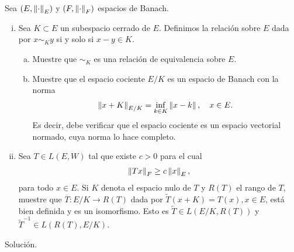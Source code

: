 \begin{homeworkProblem}
  Sea $(E,\left\|\cdot\right\|_{E})$ y $(F,\left\|\cdot\right\|_{F})$ espacios de Banach.
  \begin{enumerate}[(i)]
    \item Sea $K\subset E$ un subespacio cerrado de $E$. Definimos la relación sobre $E$ dada por $x\sim_{K} y$ si y solo si $x-y\in K$.
    \begin{enumerate}[(a)]
      \item Muestre que $\sim_{K}$ es una relación de equivalencia sobre $E$.
      \item Muestre que el espacio cociente $E/K$ es un espacio de Banach con la norma
        \begin{align*}
          \left\|x+K\right\|_{E/K}=\inf_{k\in K}\left\|x-k\right\|,\quad x\in E.
        \end{align*}
        Es decir, debe verificar que el espacio cociente es un espacio vectorial normado, cuya norma lo hace completo.
    \end{enumerate}
    \item Sea $T\in L(E,W)$ tal que existe $c>0$ para el cual
      \begin{align*}
        \left\|Tx\right\|_{F}\geq c\left\|x\right\|_{E},
      \end{align*}
      para todo $x\in E$. Si $K$ denota el espacio nulo de $T$ y $R(T)$ el rango de $T$, muestre que $\overline{T}:E/K\to R(T)$ dada por $\tilde{T}(x+K)=T(x),x\in E$, está bien definida y es un isomorfismo. Esto es $\tilde{T}\in L(E/K,R(T))$ y $\tilde{T}^{-1}\in L(R(T),E/K)$.  
  \end{enumerate}
  \begin{solution}
    Solución.
  \end{solution}
\end{homeworkProblem}
